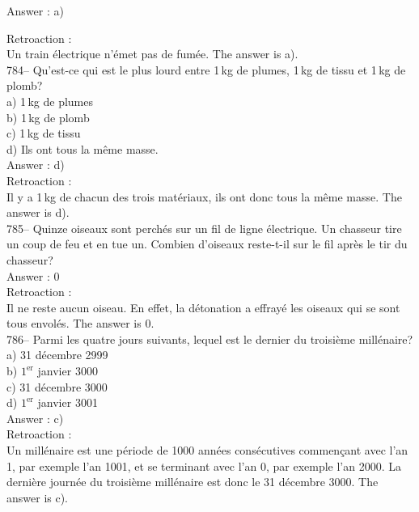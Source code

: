 ﻿\documentclass[letterpaper, 12pt]{article}
\begin{document}
Answer : a)

Retroaction : \\
Un train \'electrique n'\'emet pas de fum\'ee. The answer is a).\\

784-- Qu'est-ce qui est le plus lourd entre 1\,kg de plumes, 1\,kg de tissu
et 1\,kg de plomb?\\
a) 1\,kg de plumes\\
b) 1\,kg de plomb\\
c) 1\,kg de tissu\\
d) Ils ont tous la m\^eme masse.\\

Answer : d)\\

Retroaction : \\
Il y a 1\,kg de chacun des trois mat\'eriaux, ils ont donc tous la m\^eme
masse.  The answer is d).\\

785-- Quinze oiseaux sont perch\'es sur un fil de ligne \'electrique.  Un
chasseur tire un coup de feu et en tue un.  Combien d'oiseaux reste-t-il sur
le fil apr\`es le tir du chasseur?\\

Answer : 0\\

Retroaction : \\
Il ne reste aucun oiseau. En effet, la d\'etonation a effray\'e les oiseaux
qui se sont tous envol\'es. The answer is 0. \\

786-- Parmi les quatre jours suivants, lequel est le dernier du troisi\`eme
mill\'enaire?\\
a) 31 d\'ecembre 2999\\
b) $1^{\textrm{er}}$ janvier 3000\\
c) 31 d\'ecembre 3000\\
d) $1^{\textrm{er}}$ janvier 3001\\

Answer : c)\\

Retroaction : \\
Un mill\'enaire est une p\'eriode de 1000 ann\'ees cons\'ecutives commen\c
cant avec l'an 1, par exemple l'an 1001, et se terminant avec l'an 0, par
exemple l'an 2000.  La derni\`ere journ\'ee du troisi\`eme mill\'enaire est
donc le 31 d\'ecembre 3000.  The answer is c).\\
\end{document}
